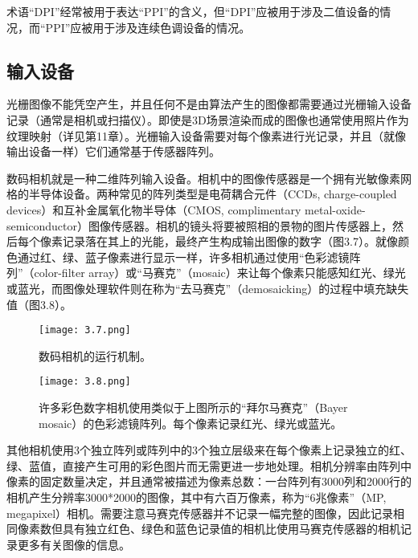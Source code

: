\documentclass[lang=cn,12pt]{elegantbook}
\begin{document}
\begin{note}
术语“DPI”经常被用于表达“PPI”的含义，但“DPI”应被用于涉及二值设备的情况，而“PPI”应被用于涉及连续色调设备的情况。
\end{note}

\subsection{输入设备}

光栅图像不能凭空产生，并且任何不是由算法产生的图像都需要通过光栅输入设备记录（通常是相机或扫描仪）。即使是3D场景渲染而成的图像也通常使用照片作为纹理映射（详见第11章）。光栅输入设备需要对每个像素进行光记录，并且（就像输出设备一样）它们通常基于传感器阵列。

数码相机就是一种二维阵列输入设备。相机中的图像传感器是一个拥有光敏像素网格的半导体设备。两种常见的阵列类型是电荷耦合元件（CCDs, charge-coupled devices）和互补金属氧化物半导体（CMOS, complimentary metal-oxide-semiconductor）图像传感器。相机的镜头将要被照相的景物的图片传感器上，然后每个像素记录落在其上的光能，最终产生构成输出图像的数字（图3.7）。就像颜色通过红、绿、蓝子像素进行显示一样，许多相机通过使用“色彩滤镜阵列”（color-filter array）或“马赛克”（mosaic）来让每个像素只能感知红光、绿光或蓝光，而图像处理软件则在称为“去马赛克”（demosaicking）的过程中填充缺失值（图3.8）。

\begin{figure}[htb]
  \centering
  \begin{minipage}[t]{0.45\textwidth}
  \centering
  \texttt{[image: 3.7.png]}
  \caption{数码相机的运行机制。}
  \end{minipage}
  \begin{minipage}[t]{0.45\textwidth}
  \centering
  \texttt{[image: 3.8.png]}
  \caption{许多彩色数字相机使用类似于上图所示的“拜尔马赛克”（Bayer mosaic）的色彩滤镜阵列。每个像素记录红光、绿光或蓝光。}
  \end{minipage}
\end{figure}

其他相机使用3个独立阵列或阵列中的3个独立层级来在每个像素上记录独立的红、绿、蓝值，直接产生可用的彩色图片而无需更进一步地处理。相机分辨率由阵列中像素的固定数量决定，并且通常被描述为像素总数：一台阵列有3000列和2000行的相机产生分辨率3000*2000的图像，其中有六百万像素，称为“6兆像素”（MP, megapixel）相机。需要注意马赛克传感器并不记录一幅完整的图像，因此记录相同像素数但具有独立红色、绿色和蓝色记录值的相机比使用马赛克传感器的相机记录更多有关图像的信息。
\end{document}
